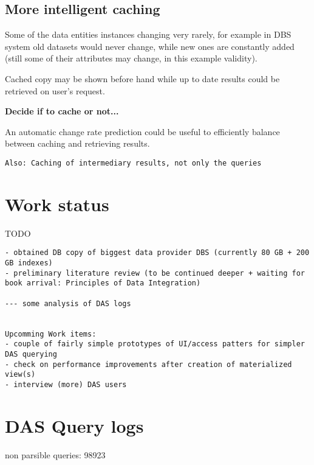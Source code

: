 \documentclass[a4paper,11pt,draft]{article}
\begin{document}
\subsection{More intelligent caching}
Some of the data entities instances changing very rarely, for example in DBS system old datasets would never change, while new ones are constantly added (still some of their attributes may change, in this example validity).

Cached copy may be shown before hand while up to date results could be retrieved on user's request.

\textbf{Decide if to cache or not...}


An automatic change rate prediction could be useful to efficiently balance between caching and retrieving results.

\begin{verbatim}
Also: Caching of intermediary results, not only the queries
\end{verbatim}

\section{Work status}
TODO

\begin{verbatim}
- obtained DB copy of biggest data provider DBS (currently 80 GB + 200 GB indexes)
- preliminary literature review (to be continued deeper + waiting for book arrival: Principles of Data Integration)

--- some analysis of DAS logs


Upcomming Work items:
- couple of fairly simple prototypes of UI/access patters for simpler DAS querying
- check on performance improvements after creation of materialized view(s)
- interview (more) DAS users
\end{verbatim}



\thispagestyle{empty}


\pagebreak
\appendix
\section{DAS Query logs}

non parsible queries: 98923
\end{document}

